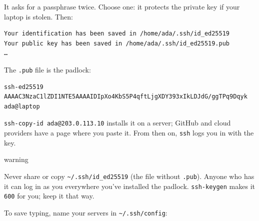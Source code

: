 
It asks for a passphrase twice. Choose one: it protects the private key if your laptop is stolen. Then:

\begin{codeblock}
\begin{Verbatim}[formatcom=\outputstyle]
Your identification has been saved in /home/ada/.ssh/id_ed25519
Your public key has been saved in /home/ada/.ssh/id_ed25519.pub
…
\end{Verbatim}
\end{codeblock}


The \texttt{.pub} file is the padlock:

\begin{codeblock}

\begin{Shaded}
\begin{Highlighting}[]
\end{Highlighting}
\end{Shaded}

\end{codeblock}

\begin{codeblock}
\begin{Verbatim}[formatcom=\outputstyle]
ssh-ed25519 AAAAC3NzaC1lZDI1NTE5AAAAIDIpXo4KbS5P4qftLjgXDY393xIkLDJdG/ggTPq9Dqyk ada@laptop
\end{Verbatim}
\end{codeblock}

\texttt{ssh-}\allowbreak{}\texttt{copy-}\allowbreak{}\texttt{id\ ada@203.}\allowbreak{}\texttt{0.}\allowbreak{}\texttt{113.}\allowbreak{}\texttt{10} installs it on a server; GitHub and cloud providers have a page where you paste it. From then on, \texttt{ssh} logs you in with the key.

\begin{callout}{warning}

Never share or copy \texttt{\textasciitilde{}/.ssh/id\_ed25519} (the file without \texttt{.pub}). Anyone who has it can log in as you everywhere you've installed the padlock. \texttt{ssh-keygen} makes it \texttt{600} for you; keep it that way.

\end{callout}


To save typing, name your servers in \texttt{\textasciitilde{}/.ssh/config}:

